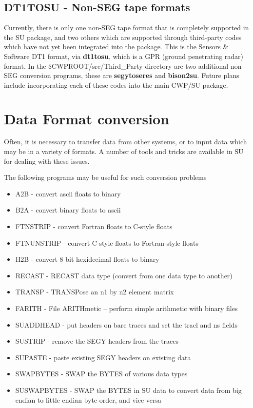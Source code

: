 {{{\subsection{DT1TOSU - Non-SEG tape formats}

Currently, there is only one non-SEG tape format that is completely supported
in the SU package, and two others which are supported through third-party
codes which have not yet been integrated into the package.
This is the Sensors \& Software DT1 format,
via {\bf dt1tosu}, which is a GPR (ground penetrating radar) format.
In the \$CWPROOT/src/Third\_Party directory are two additional
non-SEG conversion programs, these are {\bf segytoseres\/} and 
{\bf bison2su}.
Future plans include incorporating each of these codes into the main
CWP/SU package.

\section{Data Format conversion}

Often, it is necessary to transfer data from other systems, or
to input data which may be in a variety of formats. A number
of tools and tricks are available in SU for dealing with these
issues.

The following programs may be useful for such conversion problems
\begin{itemize}
\item A2B - convert ascii floats to binary
\item B2A - convert binary floats to ascii
\item FTNSTRIP - convert Fortran floats to C-style floats 
\item FTNUNSTRIP - convert C-style floats to Fortran-style floats
\item H2B - convert 8 bit hexidecimal floats to binary
\item RECAST - RECAST data type (convert from one data type to another)
\item TRANSP - TRANSPose an n1 by n2 element matrix 
\item FARITH - File ARITHmetic -- perform simple arithmetic with binary files 
\item SUADDHEAD - put headers on bare traces and set the tracl and ns fields 
\item SUSTRIP - remove the SEGY headers from the traces 
\item SUPASTE - paste existing SEGY headers on existing data
\item SWAPBYTES - SWAP the BYTES of various  data types
\item SUSWAPBYTES - SWAP the BYTES in SU data to convert data from big endian
to little endian byte order, and vice versa
\end{itemize}

}}}
